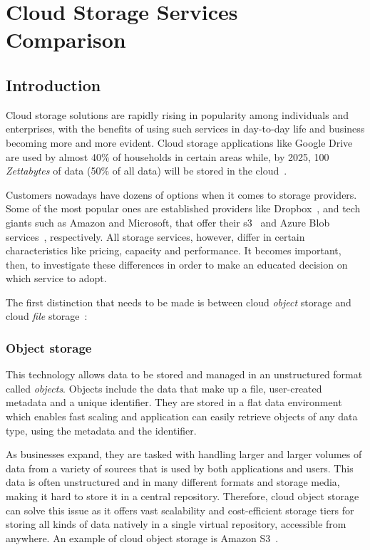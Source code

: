 \chapter{Cloud Storage Services Comparison}\label{ch:cloud-storage-services-comparison}


\section{Introduction}
Cloud storage solutions are rapidly rising in popularity among individuals and enterprises, with the benefits of using such services in day-to-day life and business becoming more and more evident. Cloud storage applications like Google Drive are used by almost 40\% of households in certain areas while, by 2025, 100 \textit{Zettabytes} of data (50\% of all data) will be stored in the cloud~\cite{zeta}.

Customers nowadays have dozens of options when it comes to storage providers. Some of the most popular ones are established providers like Dropbox~\cite{dropbox}, and tech giants such as Amazon and Microsoft, that offer their \ac{s3}~\cite{s3} and Azure Blob services~\cite{blob}, respectively. All storage services, however, differ in certain characteristics like pricing, capacity and performance. It becomes important, then, to investigate these differences in order to make an educated decision on which service to adopt.

The first distinction that needs to be made is between cloud \textit{object} storage and cloud \textit{file} storage~\cite{objectvsfile, objectvsfile2}:

\subsection{Object storage}
This technology allows data to be stored and managed in an unstructured format called \textit{objects}. Objects include the data that make up a file, user-created metadata and a unique identifier. They are stored in a flat data environment which enables fast scaling and application can easily retrieve objects of any data type, using the metadata and the identifier.

As businesses expand, they are tasked with handling larger and larger volumes of data from a variety of sources that is used by both applications and users. This data is often unstructured and in many different formats and storage media, making it hard to store it in a central repository. Therefore, cloud object storage can solve this issue as it offers vast scalability and cost-efficient storage tiers for storing all kinds of data natively in a single virtual repository, accessible from anywhere. An example of cloud object storage is Amazon S3~\cite{s3}.

